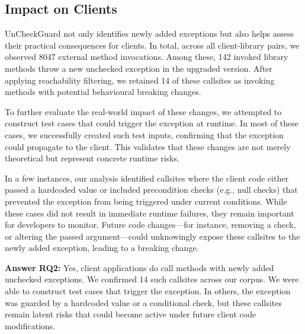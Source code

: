 \subsection{Impact on Clients}

UnCheckGuard not only identifies newly added exceptions but also helps assess their practical consequences for clients. In total, across all client-library pairs, we observed 8047 external method invocations. Among these, 142 invoked library methods throw a new unchecked exception in the upgraded version. After applying reachability filtering, we retained 14 of these callsites as invoking methods with potential behavioural breaking changes. 

To further evaluate the real-world impact of these changes, we attempted to construct test cases that could trigger the exception at runtime. In most of these cases, we successfully created such test inputs, confirming that the exception could propagate to the client. This validates that these changes are not merely theoretical but represent concrete runtime risks.

In a few instances, our analysis identified callsites where the client code either passed a hardcoded value or included precondition checks (e.g., null checks) that prevented the exception from being triggered under current conditions. While these cases did not result in immediate runtime failures, they remain important for developers to monitor. Future code changes—for instance, removing a check, or altering the passed argument—could unknowingly expose these callsites to the newly added exception, leading to a breaking change.

\vspace{1em}
\begin{tcolorbox}[colback=gray!10, colframe=black]
\textbf{Answer RQ2:} Yes, client applications do call methods with newly added unchecked exceptions. We confirmed 14 such callsites across our corpus. We were able to construct test cases that trigger the exception. In others, the exception was guarded by a hardcoded value or a conditional check, but these callsites remain latent risks that could become active under future client code modifications.
\end{tcolorbox}
\vspace{1em}

